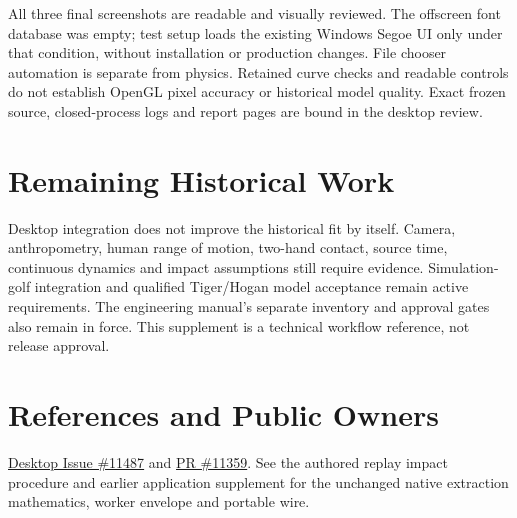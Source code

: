 \documentclass[11pt]{article}
\begin{document}
All three final screenshots are readable and visually reviewed. The offscreen
font database was empty; test setup loads the existing Windows Segoe UI only
under that condition, without installation or production changes. File chooser
automation is separate from physics. Retained curve checks and readable controls
do not establish OpenGL pixel accuracy or historical model quality. Exact frozen
source, closed-process logs and report pages are bound in the desktop review.

\section*{Remaining Historical Work}
Desktop integration does not improve the historical fit by itself. Camera,
anthropometry, human range of motion, two-hand contact, source time, continuous
dynamics and impact assumptions still require evidence. Simulation-golf
integration and qualified Tiger/Hogan model acceptance remain active requirements.
The engineering manual's separate inventory and approval gates also remain in
force. This supplement is a technical workflow reference, not release approval.

\section*{References and Public Owners}
\href{https://github.com/D-sorganization/UpstreamDrift/issues/11487}{Desktop Issue \#11487}
and \href{https://github.com/D-sorganization/UpstreamDrift/pull/11359}{PR \#11359}.
See the authored replay impact procedure and earlier application supplement for
the unchanged native extraction mathematics, worker envelope and portable wire.
\end{document}
